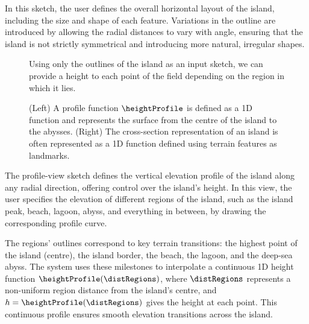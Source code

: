 In this sketch, the user defines the overall horizontal layout of the island, including the size and shape of each feature. Variations in the outline are introduced by allowing the radial distances to vary with angle, ensuring that the island is not strictly symmetrical and introducing more natural, irregular shapes.

\begin{figure}[H]
\caption{Using only the outlines of the island as an input sketch, we can provide a height to each point of the field depending on the region in which it lies.}
\label{fig:coral-island-procedural-height-only}
\end{figure}


\begin{figure}[H]
\centering
{}
\caption{(Left) A profile function $\heightProfile$ is defined as a 1D function and represents the surface from the centre of the island to the abysses. (Right) The cross-section representation of an island is often represented as a 1D function defined using terrain features as landmarks.}
\label{fig:coral-island-profile-function}
\end{figure}

The profile-view sketch defines the vertical elevation profile of the island along any radial direction, offering control over the island's height. In this view, the user specifies the elevation of different regions of the island, such as the island peak, beach, lagoon, abyss, and everything in between, by drawing the corresponding profile curve.

The regions' outlines correspond to key terrain transitions: the highest point of the island (centre), the island border, the beach, the lagoon, and the deep-sea abyss. The system uses these milestones to interpolate a continuous 1D height function $\heightProfile(\distRegions)$, where $\distRegions$ represents a non-uniform region distance from the island's centre, and $h = \heightProfile(\distRegions)$ gives the height at each point. This continuous profile ensures smooth elevation transitions across the island.

